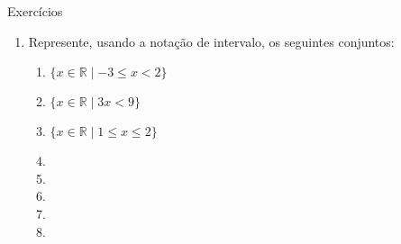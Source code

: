 \documentclass[14pt, aspectratio=169]{beamer}
\newcommand{\R}{\mathbb{R}}
\begin{document}
\begin{frame}[allowframebreaks]{Exercícios}
\begin{enumerate}
    \vspace{5.0cm}

    \item Represente, usando a notação de intervalo, os seguintes conjuntos:

    \begin{multicols}{2}
        \begin{enumerate}[a]
            \item $\{ x \in \R \mid -3 \leq x < 2 \}$
            \item $\{ x \in \R \mid  3x < 9 \}$
            \item $\{ x \in \R \mid 1 \leq x \leq 2 \}$
            \item 
            \item
            \item
            \item
            \item 
        \end{enumerate}
    \end{multicols}
    
\end{enumerate}


    
    
\end{frame}
\end{document}
